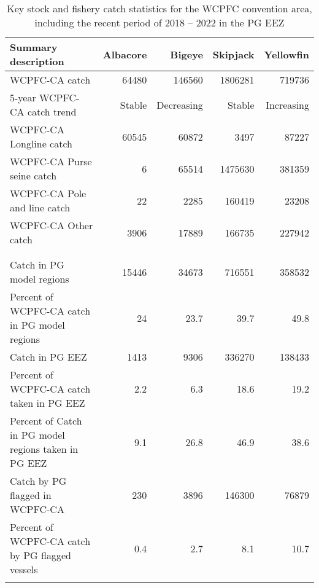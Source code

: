 \begin{longtable}{lrrrr}
\caption{Key stock and fishery catch statistics for the WCPFC convention area, including the recent period of 2018 -- 2022 in the PG EEZ} \\ 
  \hline
Summary description & Albacore & Bigeye & Skipjack & Yellowfin \\ 
  \hline
WCPFC-CA catch & 64480 & 146560 & 1806281 & 719736 \\ 
  5-year WCPFC-CA catch trend & Stable & Decreasing & Stable & Increasing \\ 
  WCPFC-CA Longline catch & 60545 & 60872 & 3497 & 87227 \\ 
  WCPFC-CA Purse seine catch & 6 & 65514 & 1475630 & 381359 \\ 
  WCPFC-CA Pole and line catch & 22 & 2285 & 160419 & 23208 \\ 
  WCPFC-CA Other catch & 3906 & 17889 & 166735 & 227942 \\ 
   &  &  &  &  \\ 
   &  &  &  &  \\ 
   \hline
Catch in PG model regions & 15446 & 34673 & 716551 & 358532 \\ 
  Percent of WCPFC-CA catch in PG model regions & 24 & 23.7 & 39.7 & 49.8 \\ 
  Catch in PG EEZ & 1413 & 9306 & 336270 & 138433 \\ 
  Percent of WCPFC-CA catch taken in PG EEZ & 2.2 & 6.3 & 18.6 & 19.2 \\ 
  Percent of Catch in PG model regions taken in PG EEZ & 9.1 & 26.8 & 46.9 & 38.6 \\ 
  Catch by PG flagged in WCPFC-CA & 230 & 3896 & 146300 & 76879 \\ 
  Percent of WCPFC-CA catch by PG flagged vessels & 0.4 & 2.7 & 8.1 & 10.7 \\ 
  \hline
\label{cat_sum_tab}
\end{longtable}
